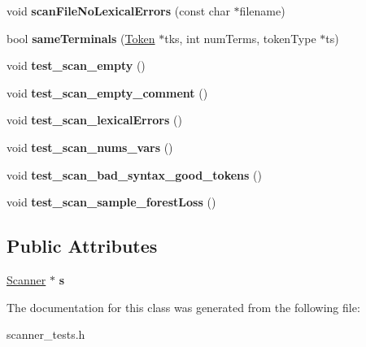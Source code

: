\begin{DoxyCompactItemize}
\item 
\hypertarget{classScannerTestSuite_a01dc6065a02127accc049627ae234129}{void {\bfseries scan\-File\-No\-Lexical\-Errors} (const char $\ast$filename)}\label{classScannerTestSuite_a01dc6065a02127accc049627ae234129}

\item 
\hypertarget{classScannerTestSuite_a97c50725866b3a5b36c36488053a59bc}{bool {\bfseries same\-Terminals} (\hyperlink{classToken}{Token} $\ast$tks, int num\-Terms, token\-Type $\ast$ts)}\label{classScannerTestSuite_a97c50725866b3a5b36c36488053a59bc}

\item 
\hypertarget{classScannerTestSuite_a01beafb44a33f4d80baf9a4208919c07}{void {\bfseries test\-\_\-scan\-\_\-empty} ()}\label{classScannerTestSuite_a01beafb44a33f4d80baf9a4208919c07}

\item 
\hypertarget{classScannerTestSuite_a304719dd961df0714d372010cdf99ef1}{void {\bfseries test\-\_\-scan\-\_\-empty\-\_\-comment} ()}\label{classScannerTestSuite_a304719dd961df0714d372010cdf99ef1}

\item 
\hypertarget{classScannerTestSuite_af85168e66ba2b924488aca9768231367}{void {\bfseries test\-\_\-scan\-\_\-lexical\-Errors} ()}\label{classScannerTestSuite_af85168e66ba2b924488aca9768231367}

\item 
\hypertarget{classScannerTestSuite_a4bd4d5fc2218f3d28b08b2821ecc271b}{void {\bfseries test\-\_\-scan\-\_\-nums\-\_\-vars} ()}\label{classScannerTestSuite_a4bd4d5fc2218f3d28b08b2821ecc271b}

\item 
\hypertarget{classScannerTestSuite_aad7648d262ef3c103f0792ef73aa3bd8}{void {\bfseries test\-\_\-scan\-\_\-bad\-\_\-syntax\-\_\-good\-\_\-tokens} ()}\label{classScannerTestSuite_aad7648d262ef3c103f0792ef73aa3bd8}

\item 
\hypertarget{classScannerTestSuite_a8248f8bda6c9909971ef13f1364ab8f8}{void {\bfseries test\-\_\-scan\-\_\-sample\-\_\-forest\-Loss} ()}\label{classScannerTestSuite_a8248f8bda6c9909971ef13f1364ab8f8}

\end{DoxyCompactItemize}
\subsection*{Public Attributes}
\begin{DoxyCompactItemize}
\item 
\hypertarget{classScannerTestSuite_a39987f3459098101d7c7fb5a4492996d}{\hyperlink{classScanner}{Scanner} $\ast$ {\bfseries s}}\label{classScannerTestSuite_a39987f3459098101d7c7fb5a4492996d}

\end{DoxyCompactItemize}


The documentation for this class was generated from the following file\-:\begin{DoxyCompactItemize}
\item 
scanner\-\_\-tests.\-h\end{DoxyCompactItemize}
